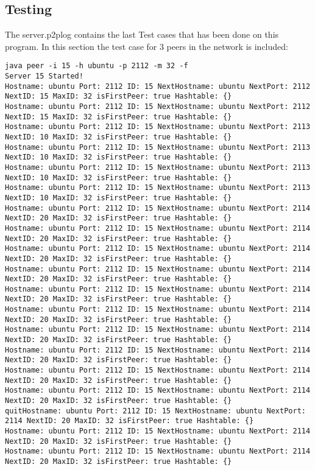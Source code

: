 \documentclass[11pt,a4paper,titlepage]{article}
\begin{document}
\subsection*{Testing}
The server.p2plog contains the last Test cases that has been done on this program. In this section the test case for 3 peers in the network is included:
\begin{verbatim}
java peer -i 15 -h ubuntu -p 2112 -m 32 -f
Server 15 Started!
Hostname: ubuntu Port: 2112 ID: 15 NextHostname: ubuntu NextPort: 2112 NextID: 15 MaxID: 32 isFirstPeer: true Hashtable: {}
Hostname: ubuntu Port: 2112 ID: 15 NextHostname: ubuntu NextPort: 2112 NextID: 15 MaxID: 32 isFirstPeer: true Hashtable: {}
Hostname: ubuntu Port: 2112 ID: 15 NextHostname: ubuntu NextPort: 2113 NextID: 10 MaxID: 32 isFirstPeer: true Hashtable: {}
Hostname: ubuntu Port: 2112 ID: 15 NextHostname: ubuntu NextPort: 2113 NextID: 10 MaxID: 32 isFirstPeer: true Hashtable: {}
Hostname: ubuntu Port: 2112 ID: 15 NextHostname: ubuntu NextPort: 2113 NextID: 10 MaxID: 32 isFirstPeer: true Hashtable: {}
Hostname: ubuntu Port: 2112 ID: 15 NextHostname: ubuntu NextPort: 2113 NextID: 10 MaxID: 32 isFirstPeer: true Hashtable: {}
Hostname: ubuntu Port: 2112 ID: 15 NextHostname: ubuntu NextPort: 2114 NextID: 20 MaxID: 32 isFirstPeer: true Hashtable: {}
Hostname: ubuntu Port: 2112 ID: 15 NextHostname: ubuntu NextPort: 2114 NextID: 20 MaxID: 32 isFirstPeer: true Hashtable: {}
Hostname: ubuntu Port: 2112 ID: 15 NextHostname: ubuntu NextPort: 2114 NextID: 20 MaxID: 32 isFirstPeer: true Hashtable: {}
Hostname: ubuntu Port: 2112 ID: 15 NextHostname: ubuntu NextPort: 2114 NextID: 20 MaxID: 32 isFirstPeer: true Hashtable: {}
Hostname: ubuntu Port: 2112 ID: 15 NextHostname: ubuntu NextPort: 2114 NextID: 20 MaxID: 32 isFirstPeer: true Hashtable: {}
Hostname: ubuntu Port: 2112 ID: 15 NextHostname: ubuntu NextPort: 2114 NextID: 20 MaxID: 32 isFirstPeer: true Hashtable: {}
Hostname: ubuntu Port: 2112 ID: 15 NextHostname: ubuntu NextPort: 2114 NextID: 20 MaxID: 32 isFirstPeer: true Hashtable: {}
Hostname: ubuntu Port: 2112 ID: 15 NextHostname: ubuntu NextPort: 2114 NextID: 20 MaxID: 32 isFirstPeer: true Hashtable: {}
Hostname: ubuntu Port: 2112 ID: 15 NextHostname: ubuntu NextPort: 2114 NextID: 20 MaxID: 32 isFirstPeer: true Hashtable: {}
Hostname: ubuntu Port: 2112 ID: 15 NextHostname: ubuntu NextPort: 2114 NextID: 20 MaxID: 32 isFirstPeer: true Hashtable: {}
quitHostname: ubuntu Port: 2112 ID: 15 NextHostname: ubuntu NextPort: 2114 NextID: 20 MaxID: 32 isFirstPeer: true Hashtable: {}
Hostname: ubuntu Port: 2112 ID: 15 NextHostname: ubuntu NextPort: 2114 NextID: 20 MaxID: 32 isFirstPeer: true Hashtable: {}
Hostname: ubuntu Port: 2112 ID: 15 NextHostname: ubuntu NextPort: 2114 NextID: 20 MaxID: 32 isFirstPeer: true Hashtable: {}


\end{verbatim}
\end{document}
